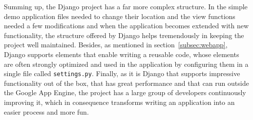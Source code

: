 Summing up, the Django project has a far more complex structure. In the simple demo application files needed to change their location and the view functions needed a few modifications and when the application becomes extended with new functionality, the structure offered by Django helps tremendously in keeping the project well maintained. Besides, as mentioned in section~\ref{subsec:webapp}, Django supports elements that enable writing a reusable code, whose elements are often strongly optimized and used in the application by configuring them in a single file called \texttt{settings.py}. Finally, as it is Django that supports impressive functionality out of the box, that has great performance and that can run outside the Google App Engine, the project has a large group of developers continuously improving it, which in consequence transforms writing an application into an easier process and more fun. 
